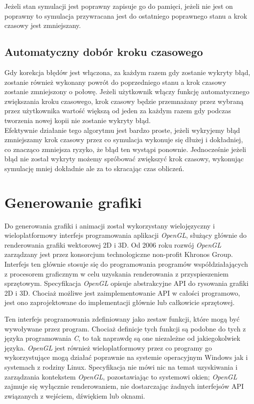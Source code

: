 \documentclass[12pt, letterpaper]{report}
\begin{document}
    Jeżeli stan symulacji jest poprawny zapisuje go do pamięci, jeżeli nie jest on poprawny to symulacja 
    przywracana jest do ostatniego poprawnego stanu a krok czasowy jest zmniejszany.

    \subsection{Automatyczny dobór kroku czasowego}
    \label{subsec:auto_dt}
    Gdy korekcja błędów jest włączona, za każdym razem gdy zostanie wykryty błąd,
    zostanie również wykonany powrót do poprzedniego stanu a krok czasowy zostanie zmniejszony o połowę. 
    Jeżeli użytkownik włączy funkcję automatycznego zwiększania
    kroku czasowego, krok czasowy będzie przemnażany przez wybraną przez użytkownika wartość większą od 
    jeden za każdym razem gdy podczas tworzenia nowej kopii nie zostanie wykryty błąd. \\
    
    Efektywnie działanie tego algorytmu jest bardzo proste, jeżeli wykryjemy błąd zmniejszamy krok czasowy
    przez co symulacja wykonuje się dłużej i dokładniej, co znacząco zmniejsza ryzyko, że błąd
    ten wystąpi ponownie. Jednocześnie jeżeli błąd nie został wykryty możemy spróbować zwiększyć 
    krok czasowy, wykonując symulację mniej dokładnie ale za to skracając czas obliczeń.

    \section{Generowanie grafiki}
    \label{sec:graphics}
    Do generowania grafiki i animacji został wykorzystany wielojęzyczny i wieloplatformowy 
    interfejs programowania aplikacji \emph{OpenGL}, służący głównie do 
    renderowania grafiki wektorowej 2D i 3D.
    Od 2006 roku rozwój \emph{OpenGL} zarządzany jest przez konsorcjum 
    technologiczne non-profit Khronos Group. 
    Interfejs ten głównie stosuje się do programowania programów współdziałających z 
    procesorem graficznym w celu uzyskania renderowania z przyspieszeniem sprzętowym. 
    Specyfikacja \emph{OpenGL} opisuje abstrakcyjne API do rysowania grafiki 2D i 3D. Chociaż możliwe jest 
    zaimplementowanie API w całości programowo, jest ono zaprojektowane do implementacji głównie 
    lub całkowicie sprzętowej.

    Ten interfejs programowania zdefiniowany jako zestaw funkcji, które mogą być wywoływane przez program.
    Chociaż definicje tych funkcji są podobne do tych z języka programowania \emph{C}, to tak 
    naprawdę są one niezależne od jakiegokolwiek języka. 
    \emph{OpenGL} jest również wieloplatformowy przez co programy go wykorzystujące mogą 
    działać poprawnie na systemie operacyjnym Windows jak i systemach z rodziny Linux. 
    Specyfikacja nie mówi nic na temat uzyskiwania i zarządzania kontekstem \emph{OpenGL}, 
    pozostawiając to systemowi okien; \emph{OpenGL} zajmuje się wyłącznie 
    renderowaniem, nie dostarczając żadnych interfejsów API związanych z wejściem, dźwiękiem lub oknami. \\
\end{document}
